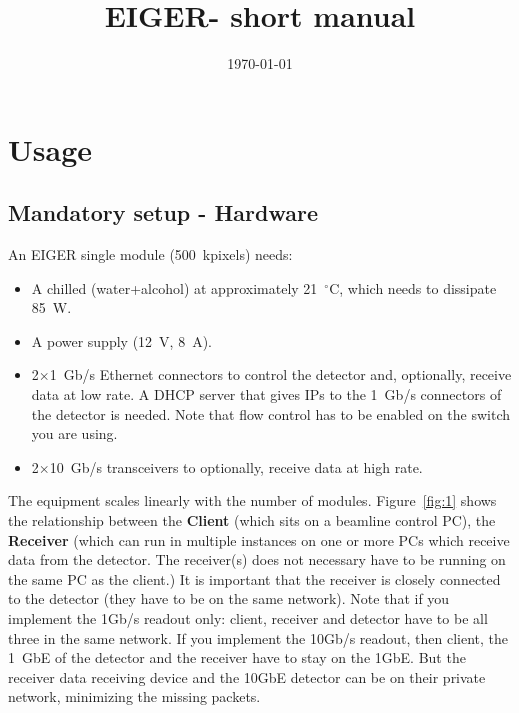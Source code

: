 \documentclass{article}
\newcommand{\E}{EIGER\xspace}
\begin{document}
\title{\E - short manual}
\date{\today}
\maketitle
\tableofcontents

\section{Usage}

\subsection{Mandatory setup - Hardware}
An EIGER single module (500~kpixels) needs:
\begin{itemize}
\item A chilled (water+alcohol) at approximately 21~$^{\circ}$C, which needs to dissipate 85~W.
\item A power supply (12~V, 8~A).
\item 2$\times$1~Gb/s Ethernet connectors to control the detector and, optionally, receive data at low rate. A DHCP server that gives IPs to the 1~Gb/s connectors of the detector is needed. Note that flow control has to be enabled on the switch you are using.
\item 2$\times$10~Gb/s transceivers to optionally, receive data at high rate.
\end{itemize}
The equipment scales linearly with the number of modules.
Figure~\ref{fig:1} shows the relationship between the \textbf{Client} (which sits on a beamline control PC), the \textbf{Receiver} (which can run in multiple instances on one or more PCs which receive data from the detector. The receiver(s) does not necessary have to be running on the same PC as the client.) It is important that the receiver is closely connected to the detector (they have to be on the same network). Note that if you implement the 1Gb/s readout only: client, receiver and detector have to be all three in the same network. If you implement the 10Gb/s readout, then client, the 1~GbE of the detector and the receiver have to stay on the 1GbE. But the receiver data receiving device and the 10GbE detector can be on their private network, minimizing the missing packets.  
\end{document}
